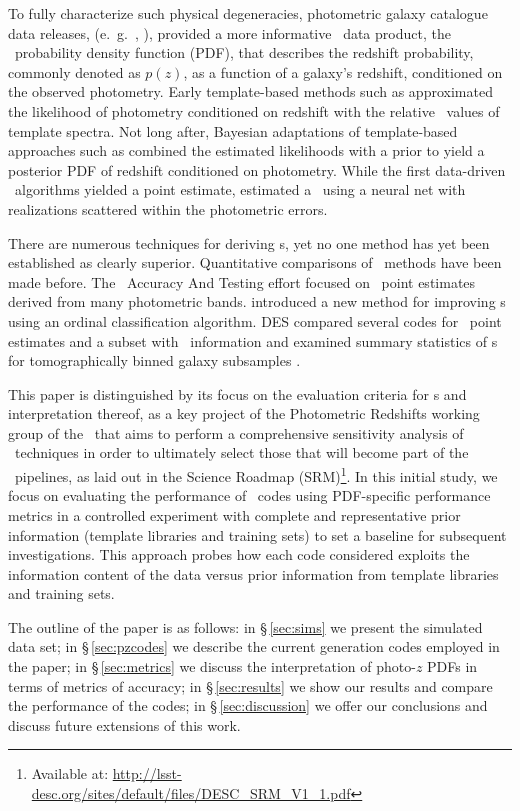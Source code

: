 To fully characterize such physical degeneracies, photometric galaxy catalogue data releases, (e.~g.~\citet{Erben:2013}, \citet{de_Jong:17}), provided a more informative \pz\ data product, the \pz\ probability density function (PDF), that describes the redshift probability, commonly denoted as $p(z)$, as a function of a galaxy's redshift, conditioned on the observed photometry.
Early template-based methods such as \citet{Fernandezsoto:99} approximated the likelihood of photometry conditioned on redshift with the relative \chisq\ values of template spectra.
Not long after, Bayesian adaptations of template-based approaches such as \citet{Benitez:00} combined the estimated likelihoods with a prior to yield a posterior PDF of redshift conditioned on photometry.
While the first data-driven \pz\ algorithms yielded a point estimate, \citet{Firth:03} estimated a \pzpdf\ using a neural net with realizations scattered within the photometric errors.

There are numerous techniques for deriving \pzpdf s, yet no one method has yet been established as clearly superior.
Quantitative comparisons of \pz\ methods have been made before.
The \Pz\ Accuracy And Testing \citep[\textsc{PHAT},][]{Hildebrandt:10} effort focused on \pz\ point estimates derived from many photometric bands.
\citet{Rau:2015} introduced a new method for improving \pzpdf s using an ordinal classification algorithm.
\textsc{DES} compared several codes for \pz\ point estimates and a subset with \pzpdf\ information \citep{Sanchez:14} and examined summary statistics of \pzpdf s for tomographically binned galaxy subsamples \citep{Bonnett:16}.

This paper is distinguished by its focus on the evaluation criteria for \pzpdf s and interpretation thereof, as a key project of the Photometric Redshifts working group of the \lsstdesc\ that aims to perform a comprehensive sensitivity analysis of \pzpdf\ techniques in order to ultimately select those that will become part of the \lsst\ pipelines, as laid out in the Science Roadmap (SRM)\footnote{Available at: \url{http://lsst-desc.org/sites/default/files/DESC_SRM_V1_1.pdf}}.
In this initial study, we focus on evaluating the performance of \pzpdf\ codes using PDF-specific performance metrics in a controlled experiment with complete and representative prior information (template libraries and training sets) to set a baseline for subsequent investigations.
This approach probes how each code considered exploits the information content of the data versus prior information from template libraries and training sets.

The outline of the paper is as follows: in \S\,\ref{sec:sims} we present the simulated data set; in \S\,\ref{sec:pzcodes} we describe the current generation codes employed in the paper; in \S\,\ref{sec:metrics} we discuss the interpretation of photo-$z$ PDFs in terms of metrics of accuracy; in \S\,\ref{sec:results} we show our results and compare the performance of the codes; in \S\,\ref{sec:discussion} we offer our conclusions and discuss future extensions of this work.
